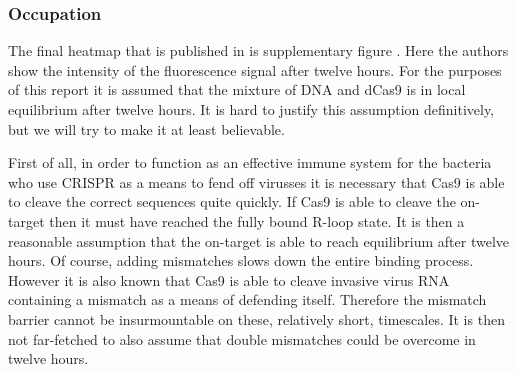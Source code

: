 \subsubsection{Occupation}

The final heatmap that is published in \cite{PNAS} is supplementary figure  . %
Here the authors show the intensity of the fluorescence signal after twelve hours. For the purposes of this report it is assumed that the mixture of DNA and dCas9 is in local equilibrium after twelve hours. It is hard to justify this assumption definitively, but we will try to make it at least believable.

First of all, in order to function as an effective immune system for the bacteria who use CRISPR as a means to fend off virusses it is necessary that Cas9 is able to cleave the correct sequences quite quickly. If Cas9 is able to cleave the on-target then it must have reached the fully bound R-loop state. It is then a reasonable assumption that the on-target is able to reach equilibrium after twelve hours. Of course, adding mismatches slows down the entire binding process. However it is also known that Cas9 is able to cleave invasive virus RNA containing a mismatch as a means of defending itself. Therefore the mismatch barrier cannot be insurmountable on these, relatively short, timescales. It is then not far-fetched to also assume that double mismatches could be overcome in twelve hours. %

